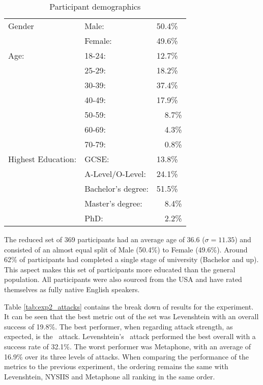 \begin{table}[h]
    \centering
    \begin{tabular}{|l|ll|}
        \hline
        Gender & Male: & 50.4\% \\
               & Female: & 49.6\% \\
        \hline
        Age:   & 18-24: & 12.7\% \\ 
               & 25-29: & 18.2\% \\ 
               & 30-39: & 37.4\% \\ 
               & 40-49: & 17.9\% \\ 
               & 50-59: & ~~8.7\% \\ 
               & 60-69: & ~~4.3\% \\ 
               & 70-79: & ~~0.8\% \\ 

        \hline
        Highest Education:  
        & GCSE:                 & 13.8\%  \\
        & A-Level/O-Level:      & 24.1\% \\
        & Bachelor's degree:    & 51.5\% \\
        & Master's degree:      & ~~8.4\% \\ 
        & PhD:                  & ~~2.2\% \\
        \hline

    \end{tabular}
    \caption{Participant demographics}
    \label{tab:exp2_demo}
\end{table}

The reduced set of 369 participants had an average age of 36.6 ($\sigma = 11.35$) and consisted of an almost equal split of Male (50.4\%) to Female (49.6\%). Around 62\% of participants had completed a single stage of university (Bachelor and up). This aspect makes this set of participants more educated than the general population. All participants were also sourced from the USA and have rated themselves as fully native English speakers.

Table \ref{tab:exp2_attacks} contains the break down of results for the experiment. It can be seen that the best metric out of the set was Levenshtein with an overall success of 19.8\%. The best performer, when regarding attack strength, as expected, is the \XOOX~attack. Levenshtein's \XOOX~attack performed the best overall with a success rate of 32.1\%. The worst performer was Metaphone, with an average of 16.9\% over its three levels of attacks. When comparing the performance of the metrics to the previous experiment, the ordering remains the same with Levenshtein, NYSIIS and Metaphone all ranking in the same order.

